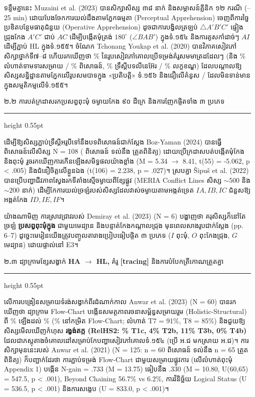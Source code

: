 \documentclass[a4paper,12pt]{article}
\newcommand{\en}[1]{{\TimesEn #1}}
\newcommand{\enbf}[1]{{\TimesEn\textbf{#1}}}
\newcommand{\tri}[1]{\ensuremath{\triangle #1}}
\newcommand{\ang}[1]{\ensuremath{\angle #1}}
\newcommand{\subsectitle}[1]{{\muol\fontsize{11pt}{14.5pt}\selectfont #1}}
\newcommand{\subsec}[1]{%
  \Needspace{1.6cm}%
  \vspace{4pt}%
  \subsectitle{#1}\par%
  \vspace{-2pt}%
  {\color{black}\hrule height 0.55pt}%
  \vspace{3.5pt}%
}
\begin{document}
ទន្ទឹមគ្នានេះ \en{Muzaini et al. (2023)} បានសិក្សាសិស្ស ៣៨ នាក់ និងសម្ភាសន៍គ្លីនិក ១២ ករណី (\en{20--25 min}) ដោយបែងចែកការយល់ដឹងតាមភ្នែកធម្មតា (\en{Perceptual Apprehension}) ចេញពីការច្នៃប្រឌិតបន្ថែមធាតុជំនួយ (\en{Operative Apprehension}) ដូចជាការបង្វិលត្រឡប់ $\tri{A'B'C'}$ ផ្ទៀងជ្រុងកែង $A'C'$ ជាប់ $AC$ ដើម្បីបង្កើតមុំត្រង់ $180^\circ$ ($\ang{BAB'}$) ក្នុងទំ.១៥៤ និងការគូសកាំដាច់ៗ $AI$ ដើម្បីភ្ជាប់ \en{HL} ក្នុងទំ.១៥៥។ ចំណែក \en{Tchonang Youkap et al. (2020)} បានវិភាគសៀវភៅសិក្សាថ្នាក់ទី៧--៨ ហើយរកឃើញថា \en{70\%} នៃរូបសៀវភៅគោលប្រើទម្រង់គំរូសមមាត្រដដែលៗ (និង \en{64.29\%} លំហាត់ទាមទារសម្រាយ / \en{35.71\%} ពិសោធន៍, \en{56\%} ទ្រឹស្ដីបទលីនេអ៊ែរ / \en{46\%} លក្ខខណ្ឌ) ដែលបណ្ដាលឱ្យសិស្សសន្និដ្ឋានតាមភ្នែកលើរូបសមបាទក្នុង «ប្រតិបត្តិ» ទំ.១៥៦ និងជឿលើគំនូស \en{/} ដែលមិនទាន់មានក្នុងសម្មតិកម្មលើទំ.១៥៥។

\subsec{២\enbf{.}២ ការបត់ក្រដាសរកប្រសព្វពុះមុំ ចម្ងាយកែង ៩០ ដឺក្រេ និងការញែកផ្ចិតទាំង ៣ ប្រភេទ}

ដើម្បីឱ្យសិស្សភ្ជាប់ទ្រឹស្ដីអរូបីទៅនឹងបទពិសោធន៍ជាក់ស្ដែង \en{Boz-Yaman (2024)} បានធ្វើពិសោធន៍លើសិស្ស \en{N = 108} (\en{56} ពិសោធន៍ ទល់នឹង \en{52} ត្រួតពិនិត្យ) ដោយប្រើក្រដាសបត់បង្កើតមុំកែង និងពុះមុំ រួចរកឃើញការកើនឡើងសមិទ្ធផលយ៉ាងខ្លាំង (\en{M = 5.34 $\to$ 8.41, t(55) = -5.062, p < .005}) និងជំនឿចិត្តលើខ្លួនឯង (\en{t(106) = 2.238, p = .027})។ ស្របគ្នា \en{\v{S}ipu\v{s} et al. (2022)} បានប្រើបញ្ហាជីវភាពស្វែងរកទីតាំងស្មើចម្ងាយពីខ្សែផ្លូវ (\en{MERIA Conflict Lines} សិស្ស $\sim 500$ និង $\sim 200$ នាក់) ដើម្បីកែការយល់ច្រឡំរបស់សិស្សដែលវាស់ចម្ងាយតាមអង្កត់ទ្រេត $IA, IB, IC$ ជំនួសឱ្យអង្កត់កែង $ID, IE, IF$។

យ៉ាងណាមិញ ការស្រាវជ្រាវរបស់ \en{Demiray et al. (2023)} (\en{N = 6}) បង្ហាញថា គរុសិស្សក៏នៅតែច្រឡំ \textbf{ប្រសព្វពុះមុំក្នុង} ជាមួយមេដ្យាន និងបន្ទាត់កែងកណ្ដាលជ្រុង មុនពេលសាងរូបជាក់ស្ដែង (\en{pp. 6--7}) ដូច្នេះមេរៀនយើងត្រូវបញ្ចូលតារាងប្រៀបធៀបផ្ចិត ៣ ប្រភេទ ($I$ ពុះមុំ, $O$ ពុះកែងជ្រុង, $G$ មេដ្យាន) ដោយផ្ទាល់នៅ \en{E3}។

\subsec{២\enbf{.}៣ ដ្យាក្រាមខ្សែសង្វាក់ \enbf{HA $\to$ HL,} គំរូ \enbf{[tracing]} និងការបំបែកត្រីកោណត្រួតគ្នា}

លើការបង្រៀនសម្រាយទំរង់សង្វាក់ពីរដំណាក់កាល \en{Anwar et al. (2023)} (\en{N = 60}) បានរកឃើញថា ដ្យាក្រាម \en{Flow-Chart} បង្កើនសមត្ថភាពរចនាសម្ព័ន្ធសម្រាយរួម (\en{Holistic-Structural}) ពី \en{0\%} ឡើងដល់ \en{50\%} (\en{90\%} នៅកម្រិត \en{Flow-Chart}; លំហាត់ \en{T7 = 91\%}, \en{T8 = 85\%}) និងជួយឱ្យសិស្សមើលឃើញកំហុស \textbf{រង្វង់តក្ក (\en{RelHS2}: \en{8\% T1c, 4\% T2b, 11\% T3b, 0\% T4b})} ដែលជាភស្តុតាងចំគោលដៅសម្រាប់កែបញ្ហាសៀវភៅគោលទំ.១៥៤ (ប្រើ អ.ជ មកស្រាយ អ.ជ)។ ការសិក្សាមុននេះរបស់ \en{Anwar et al. (2021)} (\en{N = 125}: \en{n = 60} ពិសោធន៍ ទល់នឹង \en{n = 65} ត្រួតពិនិត្យ) ក៏បញ្ជាក់ដែរថា ការភ្ជាប់ទម្រង់ \en{Flow-Chart} ជាមួយសម្រាយផ្លូវការ (លើលំហាត់ពុះមុំ \en{Appendix 1}) បង្កើន \en{N-gain = .733} (\en{M = 13.75}) ធៀបនឹង \en{.330} (\en{M = 10.80, U(60,65) = 547.5, p < .001}), \en{Beyond Chaining 56.7\% vs 6.2\%}, ការវិនិច្ឆ័យ \en{Logical Status} (\en{U = 536.5, p < .001}) និងការសង្ខេប (\en{U = 833.0, p < .001})។
\end{document}
